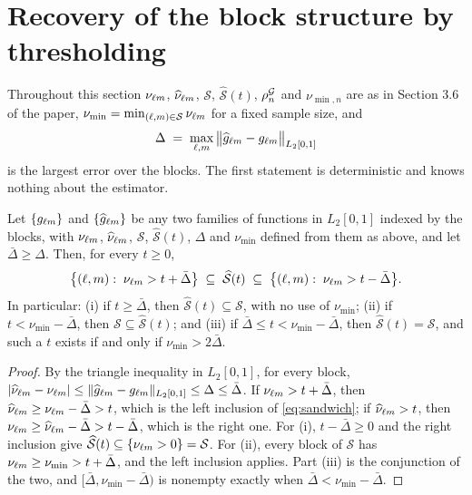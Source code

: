 \section{Recovery of the block structure by thresholding}
\setcounter{equation}{0}

Throughout this section $\nu_{\ell m}$, $\widehat{\nu}_{\ell m}$, $\mathcal{S}$,
$\widehat{\mathcal{S}}(t)$,  $\rho^{\mathcal{G}}_{n}$ and $\nu_{\min,n}$ are as in Section 3.6 of the paper,
$\nu_{\min} = \min_{(\ell,m)\in \mathcal{S}}\nu_{\ell m}$ for a fixed sample size, and
\[
  \Delta \;=\; \max_{\ell,m}\,
  \bigl\lVert \widehat{g}_{\ell m} - g_{\ell m} \bigr\rVert_{L_2[0,1]}
\]
is the largest error over the blocks. The first statement is deterministic
and knows nothing about the  estimator.

\begin{lemma}
\label{lem:sandwich}
Let $\{g_{\ell m}\}$ and $\{\widehat{g}_{\ell m}\}$ be any two families
of functions in $L_2[0,1]$ indexed by the blocks, with $\nu_{\ell m}$,
$\widehat{\nu}_{\ell m}$, $\mathcal{S}$, $\widehat{\mathcal{S}}(t)$, $\Delta$ and $\nu_{\min}$ defined
from them as above, and let $\bar{\Delta} \ge \Delta$. Then, for every $t \ge 0$,
\begin{equation}
  \label{eq:sandwich}
  \bigl\{(\ell,m) :\; \nu_{\ell m} > t + \bar{\Delta}\bigr\}
  \;\subseteq\; \widehat{\mathcal{S}}(t) \;\subseteq\;
  \bigl\{(\ell,m) :\; \nu_{\ell m} > t - \bar{\Delta}\bigr\} .
\end{equation}
In particular: (i) if $t \ge \bar{\Delta}$, then $\widehat{\mathcal{S}}(t) \subseteq \mathcal{S}$, with no
use of $\nu_{\min}$; (ii) if $t < \nu_{\min} - \bar{\Delta}$, then $\mathcal{S} \subseteq \widehat{\mathcal{S}}(t)$;
and (iii) if $\bar{\Delta} \le t < \nu_{\min} - \bar{\Delta}$, then $\widehat{\mathcal{S}}(t) = \mathcal{S}$, and such a $t$
exists if and only if $\nu_{\min} > 2\bar{\Delta}$.
\end{lemma}

\begin{proof}
By the triangle inequality in $L_2[0,1]$, for every block,
$|\widehat{\nu}_{\ell m} - \nu_{\ell m}| \le
\lVert\widehat{g}_{\ell m} - g_{\ell m}\rVert_{L_2[0,1]} \le \Delta \le \bar{\Delta}$.
If $\nu_{\ell m} > t + \bar{\Delta}$, then
$\widehat{\nu}_{\ell m} \ge \nu_{\ell m} - \bar{\Delta} > t$, which is the left inclusion of
\eqref{eq:sandwich}; if $\widehat{\nu}_{\ell m} > t$, then
$\nu_{\ell m} \ge \widehat{\nu}_{\ell m} - \bar{\Delta} > t - \bar{\Delta}$, which is the right one. For
(i), $t - \bar{\Delta} \ge 0$ and the right inclusion give $\widehat{\mathcal{S}}(t) \subseteq
\{\nu_{\ell m} > 0\} = \mathcal{S}$. For (ii), every block of $\mathcal{S}$ has
$\nu_{\ell m} \ge \nu_{\min} > t + \bar{\Delta}$, and the left inclusion applies. Part (iii) is
the conjunction of the two, and $[\bar{\Delta}, \nu_{\min} - \bar{\Delta})$ is nonempty exactly when
$\bar{\Delta} < \nu_{\min} - \bar{\Delta}$.
\end{proof}

